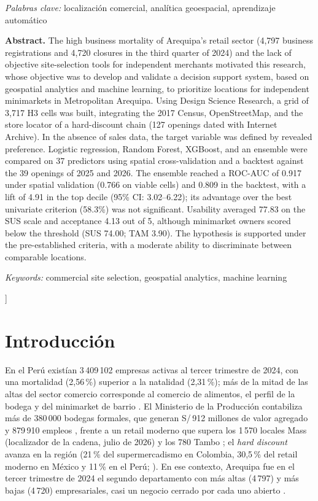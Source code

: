 \documentclass[10pt,letterpaper,twocolumn]{article}
\begin{document}
{\begin{center}
\begin{minipage}{0.94\textwidth}
\smallskip
\noindent\textit{Palabras clave:} localización comercial, analítica geoespacial, aprendizaje automático

\medskip
\noindent\textbf{Abstract.}
The high business mortality of Arequipa's retail sector (4,797 business registrations and 4,720 closures in the third quarter of 2024) and the lack of objective site-selection tools for independent merchants motivated this research, whose objective was to develop and validate a decision support system, based on geospatial analytics and machine learning, to prioritize locations for independent minimarkets in Metropolitan Arequipa. Using Design Science Research, a grid of 3,717 H3 cells was built, integrating the 2017 Census, OpenStreetMap, and the store locator of a hard-discount chain (127 openings dated with Internet Archive). In the absence of sales data, the target variable was defined by revealed preference. Logistic regression, Random Forest, XGBoost, and an ensemble were compared on 37 predictors using spatial cross-validation and a backtest against the 39 openings of 2025 and 2026. The ensemble reached a ROC-AUC of 0.917 under spatial validation (0.766 on viable cells) and 0.809 in the backtest, with a lift of 4.91 in the top decile (95\% CI: 3.02--6.22); its advantage over the best univariate criterion (58.3\%) was not significant. Usability averaged 77.83 on the SUS scale and acceptance 4.13 out of 5, although minimarket owners scored below the threshold (SUS 74.00; TAM 3.90). The hypothesis is supported under the pre-established criteria, with a moderate ability to discriminate between comparable locations.

\smallskip
\noindent\textit{Keywords:} commercial site selection, geospatial analytics, machine learning
\end{minipage}
\end{center}
\vspace{0.8em}
}]

\section{Introducción}

En el Perú existían 3\,409\,102 empresas activas al tercer trimestre de 2024, con una mortalidad (2,56\,\%) superior a la natalidad (2,31\,\%); más de la mitad de las altas del sector comercio corresponde al comercio de alimentos, el perfil de la bodega y del minimarket de barrio \citep{inei2024}. El Ministerio de la Producción contabiliza más de 380\,000 bodegas formales, que generan S/\,912 millones de valor agregado y 879\,910 empleos \citep{produce2025}, frente a un retail moderno que supera los 1\,570 locales Mass (localizador de la cadena, julio de 2026) y los 780 Tambo \citep{peruretail2026}; el \textit{hard discount} avanza en la región (21\,\% del supermercadismo en Colombia, 30,5\,\% del retail moderno en México y 11\,\% en el Perú; \citealp{deloitte2025}). En ese contexto, Arequipa fue en el tercer trimestre de 2024 el segundo departamento con más altas (4\,797) y más bajas (4\,720) empresariales, casi un negocio cerrado por cada uno abierto \citep{inei2024}.
\end{document}

